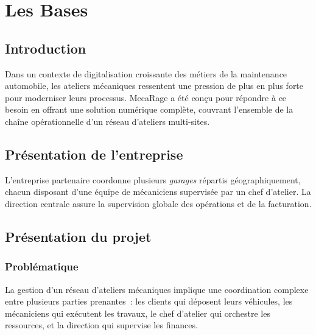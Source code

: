 \chapter{Les Bases}


\section{Introduction}

Dans un contexte de digitalisation croissante des métiers de la maintenance
automobile, les ateliers mécaniques ressentent une pression de plus en plus forte
pour moderniser leurs processus. MecaRage a été conçu pour répondre à ce besoin
en offrant une solution numérique complète, couvrant l'ensemble de la chaîne
opérationnelle d'un réseau d'ateliers multi-sites.

\section{Présentation de l'entreprise}

L'entreprise partenaire coordonne plusieurs \textit{garages} répartis géographiquement,
chacun disposant d'une équipe de mécaniciens supervisée par un chef d'atelier.
La direction centrale assure la supervision globale des opérations et de la facturation.

\section{Présentation du projet}

\subsection{Problématique}

La gestion d'un réseau d'ateliers mécaniques implique une coordination complexe
entre plusieurs parties prenantes~: les clients qui déposent leurs véhicules,
les mécaniciens qui exécutent les travaux, le chef d'atelier qui orchestre les
ressources, et la direction qui supervise les finances.

